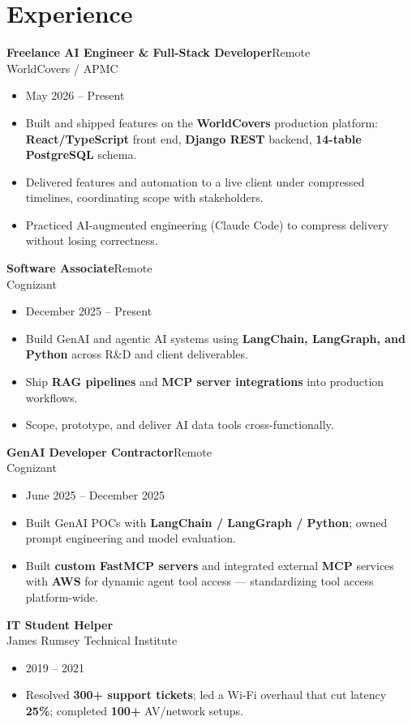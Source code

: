 \documentclass[10pt]{article}
\newcommand{\dentry}[4]{\noindent\textbf{#1}\hfill{#2}\\{#3}\hfill{#4}\par}
\begin{document}
\section*{Experience}
\dentry{Freelance AI Engineer \& Full-Stack Developer}{Remote}{WorldCovers / APMC}{}
\begin{itemize}
  \item May 2026 – Present
  \item Built and shipped features on the \textbf{WorldCovers} production platform: \textbf{React/TypeScript} front end, \textbf{Django REST} backend, \textbf{14-table PostgreSQL} schema.
  \item Delivered features and automation to a live client under compressed timelines, coordinating scope with stakeholders.
  \item Practiced AI-augmented engineering (Claude Code) to compress delivery without losing correctness.
\end{itemize}
\dentry{Software Associate}{Remote}{Cognizant}{}
\begin{itemize}
  \item December 2025 – Present
  \item Build GenAI and agentic AI systems using \textbf{LangChain, LangGraph, and Python} across R\&D and client deliverables.
  \item Ship \textbf{RAG pipelines} and \textbf{MCP server integrations} into production workflows.
  \item Scope, prototype, and deliver AI data tools cross-functionally.
\end{itemize}
\dentry{GenAI Developer Contractor}{Remote}{Cognizant}{}
\begin{itemize}
  \item June 2025 – December 2025
  \item Built GenAI POCs with \textbf{LangChain / LangGraph / Python}; owned prompt engineering and model evaluation.
  \item Built \textbf{custom FastMCP servers} and integrated external \textbf{MCP} services with \textbf{AWS} for dynamic agent tool access — standardizing tool access platform-wide.
\end{itemize}
\dentry{IT Student Helper}{}{James Rumsey Technical Institute}{}
\begin{itemize}
  \item 2019 – 2021
  \item Resolved \textbf{300+ support tickets}; led a Wi-Fi overhaul that cut latency \textbf{25\%}; completed \textbf{100+} AV/network setups.
\end{itemize}
\end{document}
